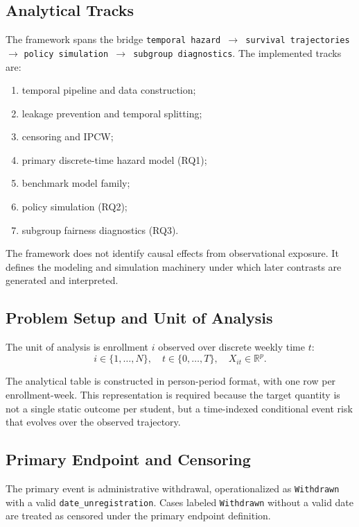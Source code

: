 \subsection{Analytical Tracks}

The framework spans the bridge
\texttt{temporal hazard $\rightarrow$ survival trajectories $\rightarrow$}
\texttt{policy simulation $\rightarrow$ subgroup diagnostics}.
The implemented tracks are:
\begin{enumerate}
\item temporal pipeline and data construction;
\item leakage prevention and temporal splitting;
\item censoring and IPCW;
\item primary discrete-time hazard model (RQ1);
\item benchmark model family;
\item policy simulation (RQ2);
\item subgroup fairness diagnostics (RQ3).
\end{enumerate}

The framework does not identify causal effects from observational exposure. It defines the modeling and simulation machinery under which later contrasts are generated and interpreted.

\subsection{Problem Setup and Unit of Analysis}

The unit of analysis is enrollment $i$ observed over discrete weekly time $t$:
\begin{equation*}
i \in \{1,\dots,N\}, \quad t \in \{0,\dots,T\}, \quad X_{it}\in\mathbb{R}^p.
\end{equation*}

The analytical table is constructed in person-period format, with one row per enrollment-week. This representation is required because the target quantity is not a single static outcome per student, but a time-indexed conditional event risk that evolves over the observed trajectory.

\subsection{Primary Endpoint and Censoring}

The primary event is administrative withdrawal, operationalized as \texttt{Withdrawn} with a valid \texttt{date\_unregistration}. Cases labeled \texttt{Withdrawn} without a valid date are treated as censored under the primary endpoint definition.

